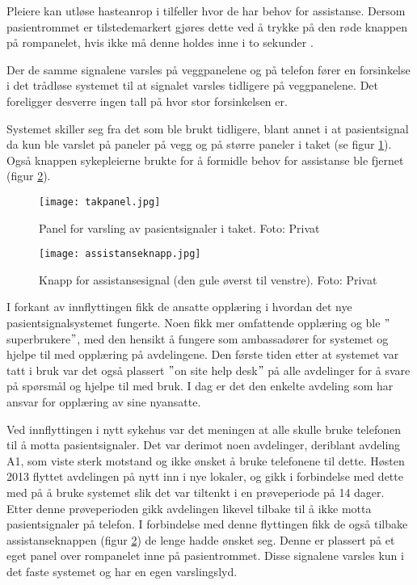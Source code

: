 \noindent
Pleiere kan utløse hasteanrop i tilfeller hvor de har behov for assistanse. Dersom pasientrommet er tilstedemarkert gjøres dette ved å trykke på den røde knappen på rompanelet, hvis ikke må denne holdes inne i to sekunder \citep{BrukerveiledningforPasientsignal}.

\noindent
Der de samme signalene varsles på veggpanelene og på telefon fører en forsinkelse i det trådløse systemet til at signalet varsles tidligere på veggpanelene. Det foreligger desverre ingen tall på hvor stor forsinkelsen er. 

\noindent
Systemet skiller seg fra det som ble brukt tidligere, blant annet i at pasientsignal da kun ble varslet på paneler på vegg og på større paneler i taket (se figur \ref{takpanel}). Også knappen sykepleierne brukte for å formidle behov for assistanse ble fjernet (figur \ref{assistanseknapp}). 

        \begin{figure}[H]
        		\centering
                \texttt{[image: takpanel.jpg]}
                \caption{Panel for varsling av pasientsignaler i taket. Foto: Privat}
                \label{takpanel}
        \end{figure}
        
        \begin{figure}[H]
        		\centering
                \texttt{[image: assistanseknapp.jpg]}
                \caption{Knapp for assistansesignal (den gule øverst til venstre). Foto: Privat}
                \label{assistanseknapp}
\end{figure}


\noindent
I forkant av innflyttingen fikk de ansatte opplæring i hvordan det nye pasientsignalsystemet fungerte. Noen fikk mer omfattende opplæring og ble $"$superbrukere$"$, med den hensikt å fungere som ambassadører for systemet og hjelpe til med opplæring på avdelingene. Den første tiden etter at systemet var tatt i bruk var det også plassert $"$on site help desk$"$ på alle avdelinger for å svare på spørsmål og hjelpe til med bruk. I dag er det den enkelte avdeling som har ansvar for opplæring av sine nyansatte. 

\noindent
Ved innflyttingen i nytt sykehus var det meningen at alle skulle bruke telefonen til å motta pasientsignaler. Det var derimot noen avdelinger, deriblant avdeling A1, som viste sterk motstand og ikke ønsket å bruke telefonene til dette.
Høsten 2013 flyttet avdelingen på nytt inn i nye lokaler, og gikk i forbindelse med dette med på å bruke systemet slik det var tiltenkt i en prøveperiode på 14 dager. Etter denne prøveperioden gikk avdelingen likevel tilbake til å ikke motta pasientsignaler på telefon. I forbindelse med denne flyttingen fikk de også tilbake assistanseknappen (figur \ref{assistanseknapp}) de lenge hadde ønsket seg. Denne er plassert på et eget panel over rompanelet inne på pasientrommet. Disse signalene varsles kun i det faste systemet og har en egen varslingslyd.

